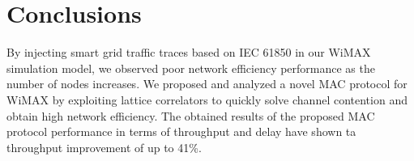\documentclass[journal,10pt,draftclsnofoot,onecolumn]{IEEEtran}
\begin{document}
\section{Conclusions}
\label{sec:conclusions}
By injecting smart grid traffic traces based on IEC 61850 in our WiMAX simulation model, we observed poor network efficiency performance as the number of nodes increases. We proposed and analyzed a novel MAC protocol for WiMAX by exploiting lattice correlators to quickly solve channel contention and obtain high network efficiency. The obtained results of the proposed MAC protocol performance in terms of throughput and delay have shown ta throughput improvement of up to 41\%.



  
\end{document}
